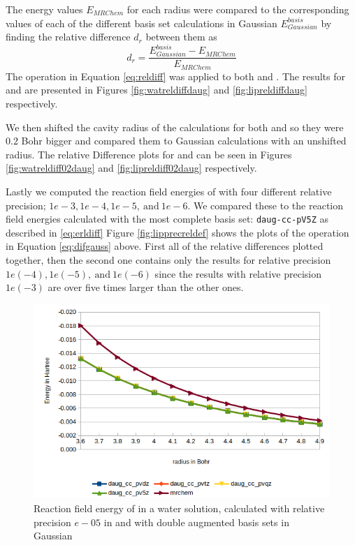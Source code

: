 \documentclass[../master_thesis.tex]{subfiles}
\begin{document}
The \mrchem energy values $E_{MRChem}$ for each radius were compared to the
corresponding values of each of the different basis set calculations in
Gaussian  $E_{Gaussian}^{basis}$ by finding the relative difference $d_r$
between them as
\begin{equation}\label{eq:reldiff}
  d_r = \frac{E_{Gaussian}^{basis} - E_{MRChem}}{E_{MRChem}}
\end{equation}
The operation in Equation \ref{eq:reldiff} was applied to both  and .
The results for  and  are presented in Figures \ref{fig:watreldiffdaug}
and \ref{fig:lipreldiffdaug} respectively.

We then shifted the cavity radius of the \mrchem calculations for both  and
 so they were $0.2$ Bohr bigger and compared them to Gaussian calculations
with an unshifted radius. The relative Difference plots for  and  can be seen
in Figures \ref{fig:watreldiff02daug} and \ref{fig:lipreldiff02daug} respectively.

Lastly we computed the reaction field energies of  with four different
relative precision; $1e-3, 1e-4, 1e-5,\  \text{and}\  1e-6$. We compared these
to the reaction field energies calculated with the most complete basis set:
\verb!daug-cc-pV5Z! as described in \ref{eq:erldiff}
Figure \ref{fig:lipprecreldef} shows the plots of the operation in Equation \ref{eq:difgauss} above.
First all of the relative differences plotted together, then the second one contains
only the results for relative precision $1e(-4), 1e(-5),\  \text{and}\  1e(-6)$ since
the results with relative precision $1e(-3)$ are over five times larger than the other ones.

\begin{figure}[!htb]
  \centering
    \includegraphics[width=0.75\linewidth]{img/Erdaugwat.png}
  \caption[Reaction field energy of ]{Reaction field energy of  in a water solution, calculated with relative precision $e-05$ in \mrchem and with double augmented basis sets in Gaussian}
  \label{fig:watEnergyplotsdaug}
\end{figure}
\end{document}
